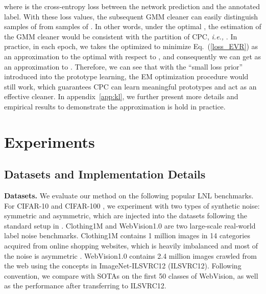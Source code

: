 \documentclass{article} \usepackage{iclr2023_conference,times}
\begin{document}
where  is the cross-entropy loss between the network prediction and the annotated label.
With these loss values,
the subsequent GMM cleaner can easily distinguish samples of  from samples of .
In other words,
under the optimal ,
the estimation of the GMM cleaner would be consistent with the partition of CPC, \emph{i.e.,} . In practice, in each epoch, we takes the  optimized to minimize Eq.~(\ref{loss_EVR}) as an approximation to the optimal  with respect to , and consequently we can get  as an approximation to . Therefore, we can see that with the ``small loss prior'' introduced into the prototype learning, the EM optimization procedure would still work, which guarantees CPC can learn meaningful prototypes and act as an effective cleaner.
In appendix~\ref{app:kl}, we further present more details and empirical results to demonstrate the approximation is hold in practice. 




\section{Experiments}\label{sec:exp}
\subsection{Datasets and Implementation Details}
\textbf{Datasets.} We evaluate our method on the following popular LNL benchmarks. For CIFAR-10 and CIFAR-100 \citep{krizhevsky2009learning}, we experiment with two types of synthetic noise: symmetric and asymmetric, which are injected into the datasets following the standard setup in \citep{Li2020DivideMixLW}. Clothing1M \citep{xiao2015learning} and WebVision1.0 \citep{li2017webvision} are two large-scale real-world label noise benchmarks. Clothing1M contains 1 million images in 14 categories acquired from online shopping websites, which is heavily imbalanced and most of the noise is asymmetric \citep{yi2019probabilistic}. WebVision1.0 contains 2.4 million images crawled from the web using the concepts in ImageNet-ILSVRC12 (ILSVRC12). Following convention, we compare with SOTAs on the first 50 classes of WebVision, as well as the performance after transferring to ILSVRC12.  
\end{document}
